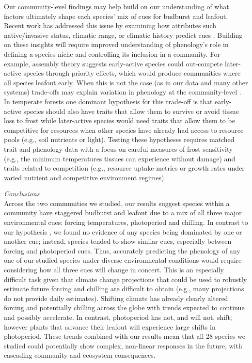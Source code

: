 \documentclass[11pt]{article}
\begin{document}
Our community-level findings may help build on our understanding of what factors ultimately shape each species' mix of cues for budburst and leafout. Recent work has addressed this issue by examining how attributes such native/invasive status, climatic range, or climatic history predict cues \citep[e.g.,][]{Laube2015,zohner2017}. Building on these insights will require improved understanding of phenology's role in defining a species niche and controlling its inclusion in a community. For example, assembly theory suggests early-active species could out-compete later-active species through priority effects, which would produce communities where all species leafout early. When this is not the case (as in our data and many other systems) trade-offs may explain variation in phenology at the community-level \citep{Chesson:1997dz}. In temperate forests one dominant hypothesis for this trade-off is that early-active species should also have traits that allow them to survive or avoid tissue loss to frost \citep{Sakai:1987aa} while later-active species would need traits that allow them to be competitive for resources when other species have already had access to resource pools (e.g., soil nutrients or light). Testing these hypotheses requires matched trait and phenology data with a focus on careful measures of frost sensitivity (e.g., the minimum temperatures tissues can experience without damage) and traits related to competition (e.g., resource uptake metrics or growth rates under varied nutrient and competitive environment regimes).

\noindent \emph{Conclusions}\\
Across the two communities we studied, our results suggest species within a community have staggered budburst and leafout due to a mix of all three major environmental cues: forcing temperatures, photoperiod and chilling. In contrast to our hypothesis \citep[and others', e.g.,][]{Korner:2010}, we found no evidence of any species being dominated by one or another cue; instead, species tended to show similar cues, especially between forcing and photoperiod cues.  Thus, accurately predicting the phenology of any one of our studied species under diverse environmental conditions would require considering how all three cues will change in concert. This is an especially difficult task given that climate change projections that could be used to robustly estimate future forcing and chilling are difficult to obtain (e.g., many projections do not provide daily estimates). Shifting climate has already clearly altered forcing and potentially chilling across the globe \citep{ipcc2013,IPCC:2014sm} with trends expected to continue and possibly accelerate. In contrast, photoperiod has not, and will not, shift; however plants that advance their leafout will experience large shifts in photoperiod. These trends combined with our results mean that all 28 species we studied could potentially show complex, non-linear responses in the future, with cascading community and ecosystem consequences. %
\end{document}
